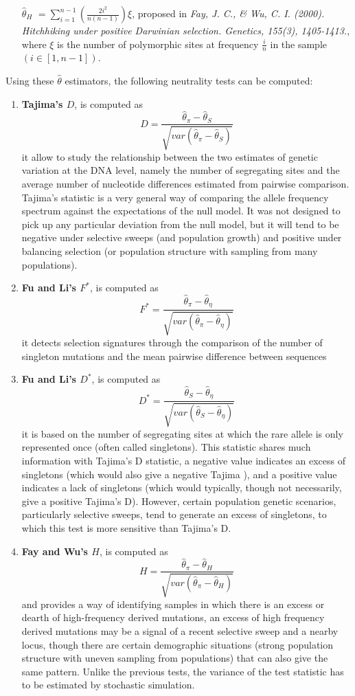 \documentclass[12pt,a4paper]{paper}
\begin{document}
\begin{enumerate}
\begin{enumerate}
\item [$\hat\theta_{H}$]$ = \sum_{i=1}^{n-1}(\frac{2i^{2}}{n(n-1)})\xi$, proposed in \textit{Fay, J. C., \& Wu, C. I. (2000). Hitchhiking under positive Darwinian selection. Genetics, 155(3), 1405-1413.}, where $\xi$ is the number of polymorphic sites at frequency $\frac{i}{n}$ in the sample $(i \in[1, n-1])$.
\end{enumerate}
Using these $\hat\theta$ estimators, the following neutrality tests can be computed:
\begin{enumerate}
\item \textbf{Tajima’s $D$}, is computed as \[ D = \frac{\hat\theta_{\pi} - \hat\theta_{S}}{\sqrt{var(\hat\theta_{\pi} - \hat\theta_{S})}} \] it allow to study the relationship between the two estimates of genetic variation at the DNA level, namely the number of segregating sites and the average number of nucleotide differences estimated from pairwise comparison. Tajima’s statistic is a very general way of comparing the allele frequency spectrum against the expectations of the null model. It was not designed to pick up any particular deviation from the null model, but it will tend to be negative under selective sweeps (and population growth) and positive under balancing selection (or population structure with sampling from many populations).
\item \textbf{Fu and Li's $F^{*}$}, is computed as \[F^{*} = \frac{\hat\theta_{\pi} - \hat\theta_{\eta}}{\sqrt{var(\hat\theta_{\pi} - \hat\theta_{\eta})}}\] it detects selection signatures through the comparison of the number of singleton mutations and the mean pairwise difference between sequences
\item \textbf{Fu and Li's $D^{*}$}, is computed as \[D^{*} = \frac{\hat\theta_{S} - \hat\theta_{\eta}}{\sqrt{var(\hat\theta_{S} - \hat\theta_{\eta})}}\]  it is based on the number of segregating sites at which the rare allele is only represented once (often called singletons). This statistic shares much information with Tajima’s D statistic, a negative value indicates an excess of singletons (which would also give a negative Tajima ), and a positive value indicates a lack of singletons (which would typically, though not necessarily, give a positive Tajima's D). However, certain population genetic scenarios, particularly selective sweeps, tend to generate an excess of singletons, to which this test is more sensitive than Tajima’s D.
\item \textbf{Fay and Wu's $H$}, is computed as \[H = \frac{\hat\theta_{\pi} - \hat\theta_{H}}{\sqrt{var(\hat\theta_{\pi} - \hat\theta_{H})}}\] and provides a way of identifying samples in which there is an excess or dearth of high-frequency derived mutations, an excess of high frequency derived mutations may be a signal of a recent selective sweep and a nearby locus, though there are certain demographic situations (strong population structure with uneven sampling from populations) that can also give the same pattern. Unlike the previous tests, the variance of the test statistic has to be estimated by stochastic simulation.
\end{enumerate}
\end{enumerate}
\end{document}
